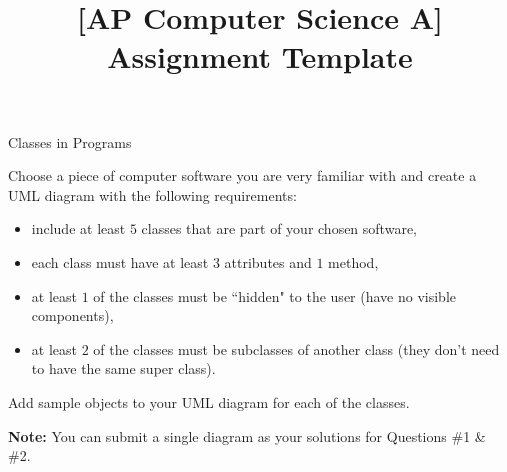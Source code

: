 \documentclass[11pt]{exam}
\title{[AP Computer Science A] Assignment Template}
\newcommand{\AssignmentTitle}{Classes in Programs}
\newcommand{\ColorQuestion}[2]{\renewcommand{\questionlabel}{\colorbox{#1}{\color{white}\thequestion}\hfill}\question #2}
\newcommand{\YellowQuestion}[1]{\ColorQuestion{Goldenrod}{#1}}
\newcommand{\RedQuestion}[1]{\ColorQuestion{BrickRed}{#1}}
\begin{document}
	\begin{center}
		\Large\AssignmentTitle
	\end{center}

	\begin{questions}
        \RedQuestion{Choose a piece of computer software you are very familiar with and create a UML diagram with the following requirements:}
        \begin{itemize}
            \item include at least $5$ classes that are part of your chosen software,
            \item each class must have at least $3$ attributes and $1$ method,
            \item at least $1$ of the classes must be ``hidden" to the user (have no visible components),
            \item at least $2$ of the classes must be subclasses of another class (they don't need to have the same super class).
        \end{itemize}
        \YellowQuestion{Add sample objects to your UML diagram for each of the classes.}
        
        {\small\textbf{Note:} You can submit a single diagram as your solutions for Questions \#1 \& \#2.}
	\end{questions}
\end{document}
